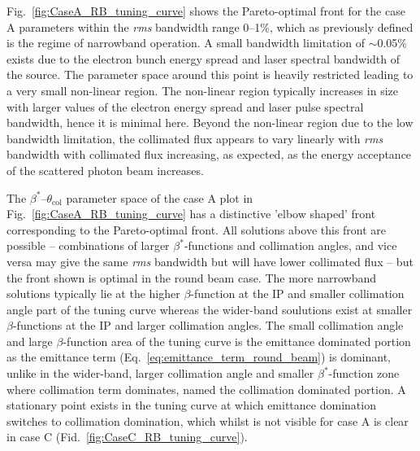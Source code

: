 \documentclass[../main.tex]{subfiles}
\begin{document}
Fig.~\ref{fig:CaseA_RB_tuning_curve} shows the Pareto-optimal front for the case A parameters within the \textit{rms} bandwidth range 0--1\%, which as previously defined is the regime of narrowband operation. A small bandwidth limitation of $\sim$0.05\% exists due to the electron bunch energy spread and laser spectral bandwidth of the source. The parameter space around this point is heavily restricted leading to a very small non-linear region. The non-linear region typically increases in size with larger values of the electron energy spread and laser pulse spectral bandwidth, hence it is minimal here. Beyond the non-linear region due to the low bandwidth limitation, the collimated flux appears to vary linearly with \textit{rms} bandwidth with collimated flux increasing, as expected, as the energy acceptance of the scattered photon beam increases.  

The $\beta^{*}$--$\theta_{\mathrm{col}}$ parameter space of the case A plot in Fig.~\ref{fig:CaseA_RB_tuning_curve} has a distinctive 'elbow shaped' front corresponding to the Pareto-optimal front. All solutions above this front are possible -- combinations of larger $\beta^{*}$-functions and collimation angles, and vice versa may give the same \textit{rms} bandwidth but will have lower collimated flux -- but the front shown is optimal in the round beam case. The more narrowband solutions typically lie at the higher $\beta$-function at the IP and smaller collimation angle part of the tuning curve whereas the wider-band soulutions exist at smaller $\beta$-functions at the IP and larger collimation angles. The small collimation angle and large $\beta$-function area of the tuning curve is the emittance dominated portion as the emittance term (Eq.~\ref{eq:emittance_term_round_beam}) is dominant, unlike in the wider-band, larger collimation angle and smaller $\beta^{*}$-function zone where collimation term dominates, named the collimation dominated portion. A stationary point exists in the tuning curve at which emittance domination switches to collimation domination, which whilst is not visible for case A is clear in case C (Fid.~\ref{fig:CaseC_RB_tuning_curve}). 
\end{document}
